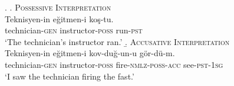 \documentclass[apacite,linguex]{glossa}\usepackage[]{graphicx}\usepackage[]{color}
\begin{document}
\ex.
\label{ex:ambiguous}
  \a. \textsc{Possessive Interpretation} \label{ex:ambiguous_possessive} \\
  \gll Teknisyen-in e\u{g}itmen-i ko\c{s}-tu.\\
       technician-\textsc{gen} instructor-\textsc{poss} run-\textsc{pst}\\
  \glt `The technician's instructor ran.'
  \b. \textsc{Accusative Interpretation} \label{ex:ambiguous_accusative}\\
  \gll Teknisyen-in e\u{g}itmen-i kov-du\u{g}-un-u g\"{o}r-d\"{u}-m.\\
  technician-\textsc{gen} instructor-\textsc{poss} fire-\textsc{nmlz}-\textsc{poss}-\textsc{acc} see-\textsc{pst}-\textsc{1sg}\\
  \glt `I saw the technician firing the fast.'


\end{document}

